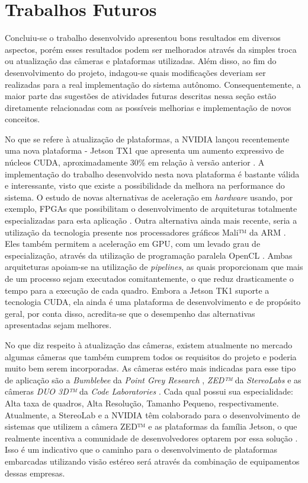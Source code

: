 \section{Trabalhos Futuros}

Concluiu-se o trabalho desenvolvido apresentou bons resultados em diversos aspectos, porém esses resultados podem ser melhorados através da simples troca ou atualização das câmeras e plataformas utilizadas. Além disso, ao fim do desenvolvimento do projeto, indagou-se quais modificações deveriam ser realizadas para a real implementação do sistema autônomo. Consequentemente, a maior parte das sugestões de atividades futuras descritas nessa seção estão diretamente relacionadas com as possíveis melhorias e implementação de novos conceitos.

No que se refere à atualização de plataformas, a NVIDIA lançou recentemente uma nova plataforma - Jetson TX1 que apresenta um aumento expressivo de núcleos CUDA, aproximadamente 30\% em relação à versão anterior \cite{JetsonTX1}. A implementação do trabalho desenvolvido nesta nova plataforma é bastante válida e interessante, visto que existe a possibilidade da melhora na performance do sistema. O estudo de novas alternativas de aceleração em \textit{hardware} usando, por exemplo, FPGAs que possibilitam o desenvolvimento de arquiteturas totalmente especializadas para esta aplicação \cite{Barry2015}. Outra alternativa ainda mais recente, seria a utilização da tecnologia presente nos processadores gráficos Mali™ da ARM \textregistered. Eles também permitem a aceleração em GPU, com um levado grau de especialização, através da utilização de programação paralela OpenCL \cite{StereoARM}. Ambas arquiteturas apoiam-se na utilização de \textit{pipelines}, as quais proporcionam que mais de um processo sejam executados comitantemente, o que reduz drasticamente o tempo para a execução de cada quadro. Embora a Jetson TK1 suporte a tecnologia CUDA, ela ainda é uma plataforma de desenvolvimento e de propósito geral, por conta disso, acredita-se que o desempenho das alternativas apresentadas sejam melhores.

No que diz respeito à atualização das câmeras, existem atualmente no mercado algumas câmeras que também cumprem todos os requisitos do projeto e poderia muito bem serem incorporadas. As câmeras estéro mais indicadas para esse tipo de aplicação são a \textit{Bumblebee} da \textit{Point Grey Research} \cite{bumblebee2}, \textit{ZED™} da \textit{StereoLabs} \cite{StereoLabsZED} e as câmeras \textit{DUO 3D™} da \textit{Code Laboratories} \cite{CodeLaboratoriesDUO}. Cada qual possui sua especialidade: Alta taxa de quadros, Alta Resolução, Tamanho Pequeno, respectivamente. Atualmente, a StereoLab e a NVIDIA têm colaborado para o desenvolvimento de sistemas que utilizem a câmera ZED™ e as plataformas da família Jetson, o que realmente incentiva a comunidade de desenvolvedores optarem por essa solução \cite{NVIDIAStereoLabsPartenership}. Isso é um indicativo que o caminho para o desenvolvimento de plataformas embarcadas utilizando visão estéreo será através da combinação de equipamentos dessas empresas.

